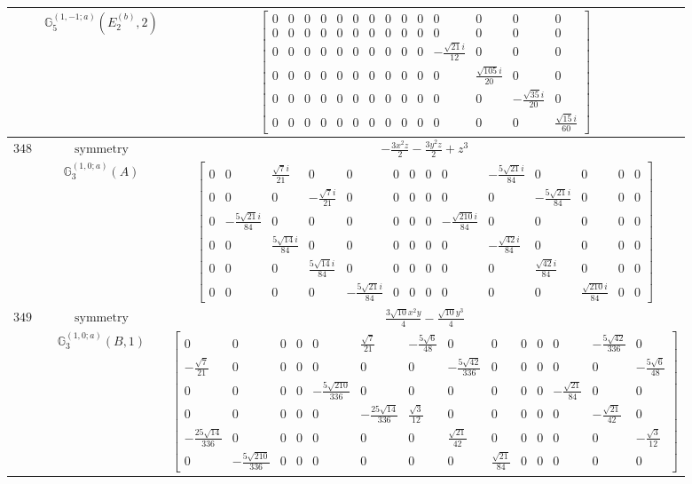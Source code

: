 \documentclass[fleqn,8pt,landscape]{jsarticle}
\begin{document}
\begin{longtable}{ccc}
$  $ & $ \mathbb{G}_{5}^{(1,-1;a)}(E_{2}^{(b)},2) $ & $ \begin{bmatrix} 0 & 0 & 0 & 0 & 0 & 0 & 0 & 0 & 0 & 0 & 0 & 0 & 0 & 0 \\ 0 & 0 & 0 & 0 & 0 & 0 & 0 & 0 & 0 & 0 & 0 & 0 & 0 & 0 \\ 0 & 0 & 0 & 0 & 0 & 0 & 0 & 0 & 0 & 0 & - \frac{\sqrt{21} i}{12} & 0 & 0 & 0 \\ 0 & 0 & 0 & 0 & 0 & 0 & 0 & 0 & 0 & 0 & 0 & \frac{\sqrt{105} i}{20} & 0 & 0 \\ 0 & 0 & 0 & 0 & 0 & 0 & 0 & 0 & 0 & 0 & 0 & 0 & - \frac{\sqrt{35} i}{20} & 0 \\ 0 & 0 & 0 & 0 & 0 & 0 & 0 & 0 & 0 & 0 & 0 & 0 & 0 & \frac{\sqrt{15} i}{60} \end{bmatrix} $ \\ \hline
$ 348 $ & $ \text{symmetry} $ & $ - \frac{3 x^{2} z}{2} - \frac{3 y^{2} z}{2} + z^{3} $ \\
$  $ & $ \mathbb{G}_{3}^{(1,0;a)}(A) $ & $ \begin{bmatrix} 0 & 0 & \frac{\sqrt{7} i}{21} & 0 & 0 & 0 & 0 & 0 & 0 & - \frac{5 \sqrt{21} i}{84} & 0 & 0 & 0 & 0 \\ 0 & 0 & 0 & - \frac{\sqrt{7} i}{21} & 0 & 0 & 0 & 0 & 0 & 0 & - \frac{5 \sqrt{21} i}{84} & 0 & 0 & 0 \\ 0 & - \frac{5 \sqrt{21} i}{84} & 0 & 0 & 0 & 0 & 0 & 0 & - \frac{\sqrt{210} i}{84} & 0 & 0 & 0 & 0 & 0 \\ 0 & 0 & \frac{5 \sqrt{14} i}{84} & 0 & 0 & 0 & 0 & 0 & 0 & - \frac{\sqrt{42} i}{84} & 0 & 0 & 0 & 0 \\ 0 & 0 & 0 & \frac{5 \sqrt{14} i}{84} & 0 & 0 & 0 & 0 & 0 & 0 & \frac{\sqrt{42} i}{84} & 0 & 0 & 0 \\ 0 & 0 & 0 & 0 & - \frac{5 \sqrt{21} i}{84} & 0 & 0 & 0 & 0 & 0 & 0 & \frac{\sqrt{210} i}{84} & 0 & 0 \end{bmatrix} $ \\ \hline
$ 349 $ & $ \text{symmetry} $ & $ \frac{3 \sqrt{10} x^{2} y}{4} - \frac{\sqrt{10} y^{3}}{4} $ \\
$  $ & $ \mathbb{G}_{3}^{(1,0;a)}(B,1) $ & $ \begin{bmatrix} 0 & 0 & 0 & 0 & 0 & \frac{\sqrt{7}}{21} & - \frac{5 \sqrt{6}}{48} & 0 & 0 & 0 & 0 & 0 & - \frac{5 \sqrt{42}}{336} & 0 \\ - \frac{\sqrt{7}}{21} & 0 & 0 & 0 & 0 & 0 & 0 & - \frac{5 \sqrt{42}}{336} & 0 & 0 & 0 & 0 & 0 & - \frac{5 \sqrt{6}}{48} \\ 0 & 0 & 0 & 0 & - \frac{5 \sqrt{210}}{336} & 0 & 0 & 0 & 0 & 0 & 0 & - \frac{\sqrt{21}}{84} & 0 & 0 \\ 0 & 0 & 0 & 0 & 0 & - \frac{25 \sqrt{14}}{336} & \frac{\sqrt{3}}{12} & 0 & 0 & 0 & 0 & 0 & - \frac{\sqrt{21}}{42} & 0 \\ - \frac{25 \sqrt{14}}{336} & 0 & 0 & 0 & 0 & 0 & 0 & \frac{\sqrt{21}}{42} & 0 & 0 & 0 & 0 & 0 & - \frac{\sqrt{3}}{12} \\ 0 & - \frac{5 \sqrt{210}}{336} & 0 & 0 & 0 & 0 & 0 & 0 & \frac{\sqrt{21}}{84} & 0 & 0 & 0 & 0 & 0 \end{bmatrix} $ \\ \hline

\end{longtable}
\end{document}
